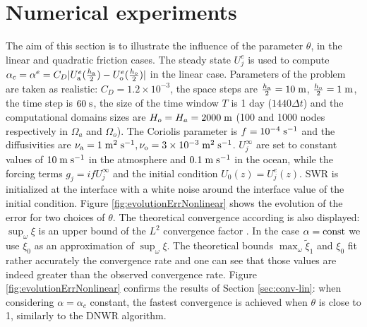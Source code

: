 \section{Numerical experiments}
\label{sec:num-exp}
The aim of this section is to illustrate the influence of the parameter $\theta$, in the linear and quadratic friction cases. 
The steady state $U_j^e$ is used to compute $\alpha_c = \alpha^e = C_D|U_{\rm a}^e(\frac{h_{\rm a}}{2}) - U_{\rm o}^e (\frac{h_{\rm o}}{2})|$ in the linear case.
Parameters of the problem are taken as realistic: $C_D = 1.2\times 10^{-3}$, the space steps are $\frac{h_{\rm a}}{2} = 10\; {\rm m}$, $\frac{h_{\rm o}}{2} = 1 \;{\rm m}$,
the time step  is $60 \;{\rm s}$,
the size of the time window $T$ is 1 day ($1440\Delta t$) and the computational domains sizes are $H_o = H_a = 2000 \; {\rm m}$
(100 and 1000 nodes respectively in $\Omega_a$ and $\Omega_o$).
The Coriolis parameter is 
$f=10^{-4}\; {\rm s^{-1}}$ and the diffusivities are 
$\nu_{\rm a} = 1\; {\rm m^2}\;{\rm s}^{-1}, 
\nu_{\rm o} = 3\times 10^{-3} \;{\rm m^2}\;{\rm s}^{-1}$. 
 $U_j^\infty$
are  set to constant values of $10\;{\rm m}\;{\rm s}^{-1}$ in the 
atmosphere and $0.1\;{\rm m}\;{\rm s}^{-1}$ in the ocean, while the forcing terms 
$g_j=i f U^\infty_j$ and the initial condition $U_0(z)=U_j^e(z)$.
SWR is 
initialized at the interface with a white noise around the interface value
of the initial condition.
Figure \ref{fig:evolutionErrNonlinear} shows the evolution of the error for two choices of $\theta$. The theoretical
convergence according is
also displayed: $\sup_\omega \xi$ is an upper bound of the $L^2$ convergence factor \cite{thery_etude_2021}. In the case
$\alpha={\rm const}$ we use $\xi_0$ as an approximation of
$\sup_\omega \xi$.
The theoretical bounds $\max_\omega \widetilde{\xi}_1$ and $\xi_0$
fit rather accurately the convergence rate and one can see that
those values are indeed greater than the observed convergence rate.
Figure \ref{fig:evolutionErrNonlinear} confirms the results of Section \ref{sec:conv-lin}:
when considering $\alpha=\alpha_c$ constant, the fastest convergence is achieved when $\theta$ is close to 1, similarly to the DNWR algorithm.
